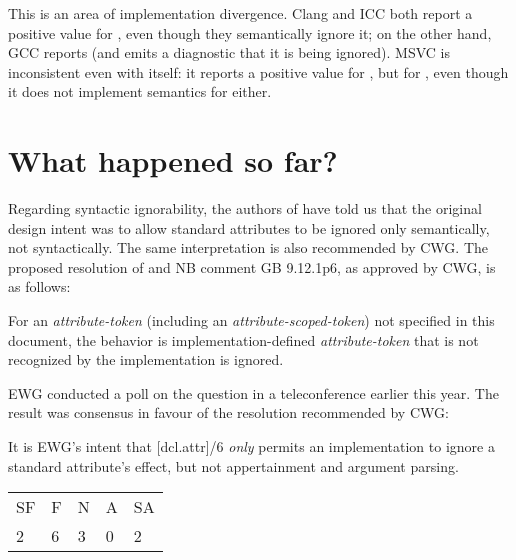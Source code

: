 This is an area of implementation divergence. Clang and ICC both report a positive value for \mbox{}, even though they semantically ignore it; on the other hand, GCC reports  (and emits a diagnostic that it is being ignored). MSVC is inconsistent even with itself: it reports a positive value for \mbox{}, but  for \mbox{}, even though it does not implement semantics for either.

\section{What happened so far?}

Regarding syntactic ignorability, the authors of \cite{N2761} have told us that the original design intent was to allow standard attributes to be ignored only semantically, not syntactically. The same interpretation is also recommended by CWG. The proposed resolution of \cite{CWG2538} and NB comment GB 9.12.1p6, as approved by CWG, is as follows:

\begin{adjustwidth}{0.5cm}{0.5cm}
For an \emph{attribute-token} (including an \emph{attribute-scoped-token})  not specified in this document, the behavior is implementation-defined \emph{attribute-token} that is not recognized by the implementation is ignored.

\end{adjustwidth}

EWG conducted a poll on the question in a teleconference earlier this year. The result was consensus in favour of the resolution recommended by CWG:

\begin{adjustwidth}{0.5cm}{0.5cm}
It is EWG's intent that [dcl.attr]/6 \emph{only} permits an implementation to ignore a standard attribute's effect, but not appertainment and argument parsing.

\begin{tabular}{lllll}
SF & F & N & A & SA \\
2 & 6 & 3 & 0 & 2
\end{tabular}
\end{adjustwidth}

